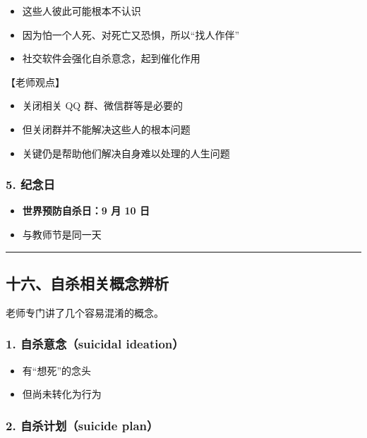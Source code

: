 \documentclass[
  chinese,
  9pt,
  a4paper,
]{ctexart}
\providecommand{\tightlist}{%
  \setlength{\itemsep}{0pt}\setlength{\parskip}{0pt}}
\begin{document}
\begin{itemize}
\tightlist
\item
  这些人彼此可能根本不认识
\item
  因为怕一个人死、对死亡又恐惧，所以``找人作伴''
\item
  社交软件会强化自杀意念，起到催化作用
\end{itemize}

【老师观点】

\begin{itemize}
\tightlist
\item
  关闭相关 QQ 群、微信群等是必要的
\item
  但关闭群并不能解决这些人的根本问题
\item
  关键仍是帮助他们解决自身难以处理的人生问题
\end{itemize}

\subsubsection{5. 纪念日}\label{ux7eaaux5ff5ux65e5}

\begin{itemize}
\tightlist
\item
  \textbf{世界预防自杀日：9 月 10 日}
\item
  与教师节是同一天
\end{itemize}

\begin{center}\rule{0.5\linewidth}{0.5pt}\end{center}

\subsection{十六、自杀相关概念辨析}\label{ux5341ux516dux81eaux6740ux76f8ux5173ux6982ux5ff5ux8fa8ux6790}

老师专门讲了几个容易混淆的概念。

\subsubsection{1. 自杀意念（suicidal
ideation）}\label{ux81eaux6740ux610fux5ff5suicidal-ideation}

\begin{itemize}
\tightlist
\item
  有``想死''的念头
\item
  但尚未转化为行为
\end{itemize}

\subsubsection{2. 自杀计划（suicide
plan）}\label{ux81eaux6740ux8ba1ux5212suicide-plan}
\end{document}

